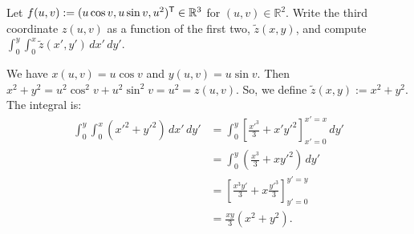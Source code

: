\begin{example}
\label{ex:surface_parametrization_integral}
Let $f(u,v) := (u\cos v, u\sin v, u^2)^{\mathsf{T}} \in \mathbb{R}^3$ for $(u,v) \in \mathbb{R}^2$. Write the third coordinate $z(u,v)$ as a function of the first two, $\tilde{z}(x,y)$, and compute $\int_0^y \int_0^x \tilde{z}(x',y') \,dx'\,dy'$.

We have $x(u,v) = u\cos v$ and $y(u,v) = u\sin v$. Then $x^2 + y^2 = u^2\cos^2 v + u^2\sin^2 v = u^2 = z(u,v)$.
So, we define $\tilde{z}(x,y) := x^2 + y^2$.
The integral is:
\begin{align}
\int_0^y \int_0^x (x'^2 + y'^2) \,dx'\,dy'
&= \int_0^y \left[ \frac{x'^3}{3} + x'y'^2 \right]_{x'=0}^{x'=x} \,dy' \nonumber \\
&= \int_0^y \left( \frac{x^3}{3} + x y'^2 \right) \,dy' \nonumber \\
&= \left[ \frac{x^3 y'}{3} + x \frac{y'^3}{3} \right]_{y'=0}^{y'=y} \nonumber \\
&= \frac{xy}{3}(x^2 + y^2). \label{eq:surface_integral_result}
\end{align}
\end{example}

